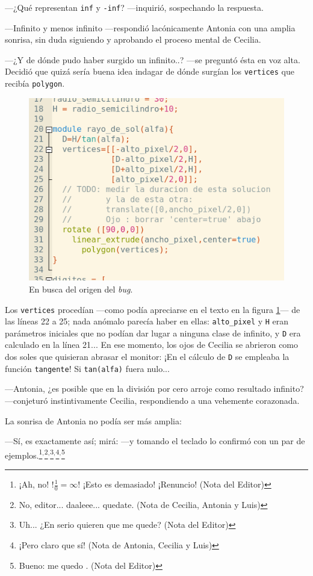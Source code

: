 ---¿Qué representan \lstinline!inf! y \lstinline!-inf!? ---inquirió,
sospechando la respuesta.

---Infinito y menos infinito ---respondió lacónicamente Antonia con
una amplia sonrisa, sin duda siguiendo y aprobando el proceso mental
de Cecilia.

---¿Y de dónde pudo haber surgido un infinito..? ---se preguntó ésta
en voz alta. Decidió que quizá sería buena idea indagar de dónde
surgían los \lstinline!vertices! que recibía \lstinline!polygon!.


\begin{figure}[ht]
  \centering
  \includegraphics[width=.75\textwidth]{imagenes/bug-linea-32-b}  
  \caption[Origen del \emph{bug}.]{En busca del origen del
    \emph{bug}.}
  \label{fig:bug-linea-32-b}
\end{figure}


Los \lstinline!vertices! procedían ---como podía apreciarse en el
texto en la figura \ref{fig:bug-linea-32-b}--- de las líneas 22 a 25;
nada anómalo parecía haber en ellas: \lstinline!alto_pixel! y
\lstinline!H!  eran parámetros iniciales que no podían dar lugar a
ninguna clase de infinito, y \lstinline!D! era calculado en la línea
21... En ese momento, los ojos de Cecilia se abrieron como dos soles
que quisieran abrasar el monitor: ¡En el cálculo de \lstinline!D! se
empleaba la función \lstinline!tangente!! Si \lstinline!tan(alfa)!
fuera nulo...

---Antonia, ¿es posible que en \openscad{} la división por cero arroje
como resultado infinito? ---conjeturó instintivamente Cecilia,
respondiendo a una vehemente corazonada.

La sonrisa de Antonia no podía ser más amplia:

---Sí, es exactamente así; mirá: ---y tomando el teclado lo confirmó
con un par de ejemplos.\footnote{¡Ah, no! !$\frac{1}{0}=\infty$! ¡Esto
  es demasiado!  ¡Renuncio! (Nota del Editor)}$^,$\footnote{No,
  editor... daaleee... quedate. (Nota de Cecilia, Antonia y
  Luis)}$^,$\footnote{Uh... ¿En serio quieren que me quede? (Nota del
  Editor)}$^,$\footnote{¡Pero claro que sí! (Nota de Antonia, Cecilia
  y Luis)}$^,$\footnote{Bueno: me quedo . (Nota del
  Editor)}

